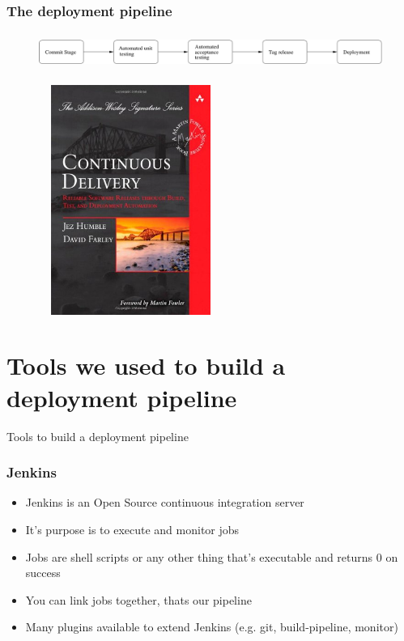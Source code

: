 \documentclass{beamer}
\begin{document}
\begin{frame}
  \frametitle{The deployment pipeline}
  \begin{figure}[ht]
    \centering
      \includegraphics[height=1.2cm,width=11.5cm]{../pics/deployment_pipline}
    \label{fig:stack}
  \end{figure}
\end{frame}

\begin{frame}
  \begin{figure}[ht]
    \centering
      \includegraphics[height=7.5cm,width=6cm]{../pics/cd_book}
    \label{fig:stack}
  \end{figure}
\end{frame}

\section{Tools we used to build a deployment pipeline}
\begin{frame}
  \center \huge Tools to build a deployment pipeline
\end{frame}


\begin{frame}
  \frametitle{Jenkins}

  \begin{itemize}
  \item Jenkins is an Open Source continuous integration server
  \item It's purpose is to execute and monitor jobs
  \item Jobs are shell scripts or any other thing that's executable
    and returns 0 on success
  \item You can link jobs together, thats our pipeline
  \item Many plugins available to extend Jenkins (e.g. git, build-pipeline, monitor)
  \end{itemize}

\end{frame}
\end{document}
